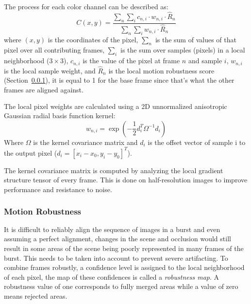 \documentclass{sig-alternate}
\begin{document}
The process for each color channel can be described as:
\begin{equation}
C(x, y)=\frac{\sum_{n} \sum_{i} c_{n, i} \cdot w_{n, i} \cdot \hat{R}_{n}}{\sum_{n} \sum_{i} w_{n, i} \cdot \hat{R}_{n}}
\end{equation}
where $(x,y)$ is the coordinates of the pixel, $\sum_{n}$ is the sum of values of that pixel over all contributing frames, $\sum_{i}$ is the sum over samples (pixels) in a local neighborhood ($3\times 3$), $c_{n, i}$ is the value of the pixel at frame $n$ and sample $i$, $w_{n, i}$ is the local sample weight, and $\hat{R}_{n}$ is the local motion robustness score (Section~\ref{sec:robustnessModel}), it is equal to 1 for the base frame since that's what the other frames are aligned against. \cite{Wronski2019}

The local pixel weights are calculated using a 2D unnormalized anisotropic Gaussian radial basis function kernel:
\begin{equation}
w_{n, i}=\exp \left(-\frac{1}{2} d_{i}^{T} \Omega^{-1} d_{i}\right)
\end{equation}
Where $\Omega$ is the kernel covariance matrix and $d_{i}$ is the offset vector of sample i to the output pixel ($d_{i}=\left[x_{i}-x_{0}, y_{i}-y_{0}\right]^{T}$).

The kernel covariance matrix is computed by analyzing the local gradient structure tensor of every frame. This is done on half-resolution images to improve performance and resistance to noise.

\subsubsection{Motion Robustness}
\label{sec:robustnessModel}

It is difficult to reliably align the sequence of images in a burst and even assuming a perfect alignment, changes in the scene and occlusion would still result in some areas of the scene being poorly represented in many frames of the burst. This needs to be taken into account to prevent severe artifacting. To combine frames robustly, a confidence level is assigned to the local neighborhood of each pixel, the map of these confidences is called a \emph{robustness map}.
A robustness value of one corresponds to fully merged areas while a value of zero means rejected areas.
\end{document}

